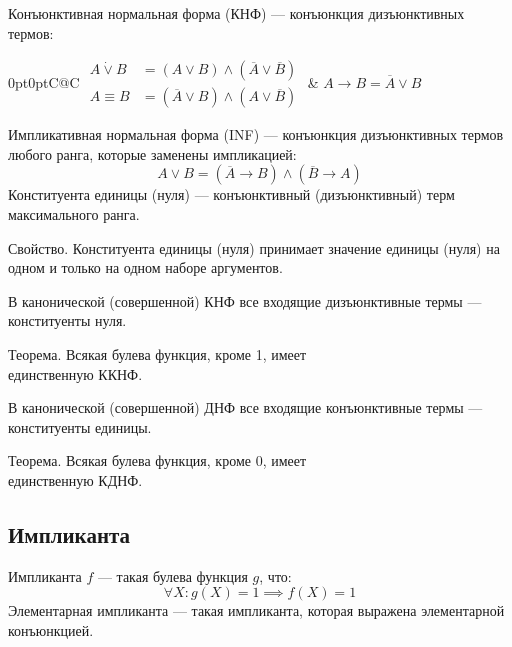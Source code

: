 {\bold Конъюнктивная нормальная форма} {\ital (КНФ)} --- конъюнкция дизъюнктивных термов:
\begin{theorem}
\begin{tabularcx}{0pt}{0pt}{C@{\hspace*{-16pt}}C}{\textwidth}
$\begin{aligned}
A\dot{\lor}B&=(A\lor B)\land(\overline{A}\lor\overline{B})\\
A\equiv B&=(\overline{A}\lor B)\land(A\lor\overline{B})
\end{aligned}$\hspace*{-18pt} & $A\rightarrow B=\overline{A}\lor B$
\end{tabularcx}
\end{theorem}
{\bold Импликативная нормальная форма} {\ital (INF)} --- конъюнкция дизъюнктивных термов любого ранга, которые заменены импликацией:
$$A\lor B=(\overline{A}\rightarrow B)\land(\overline{B}\to A)$$
{\bold Конституента единицы} {\ital (нуля)} --- конъюнктивный {\ital (дизъюнктивный)} терм максимального ранга.

\begin{theorem}
{\bold Свойство.} Конституента единицы {\ital (нуля)} принимает значение единицы {\ital (нуля)} на одном и только на одном наборе аргументов.
\end{theorem}

В {\bold канонической {\ital (совершенной)} КНФ} все входящие дизъюнктивные термы --- конституенты нуля.

\begin{theorem}
{\bold Теорема.} Всякая булева функция, кроме 1, имеет\\ единственную ККНФ.
\end{theorem}

В {\bold канонической {\ital (совершенной)} ДНФ} все входящие конъюнктивные термы --- конституенты единицы.

\begin{theorem}
{\bold Теорема.} Всякая булева функция, кроме 0, имеет\\ единственную КДНФ.
\end{theorem}

\subsection{Импликанта}

{\bold Импликанта} $f$ --- такая булева функция $g$, что:
$$\forall X\colon g(X)=1\implies f(X)=1$$
{\bold Элементарная импликанта} --- такая импликанта, которая выражена элементарной конъюнкцией.

